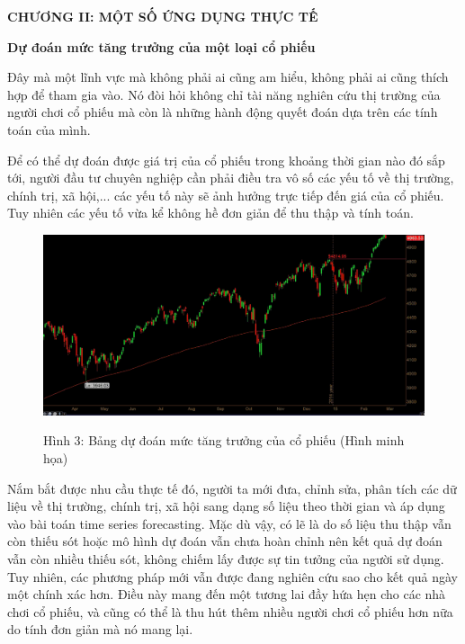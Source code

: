 \newpage
\changefontsizes{16pt}
\centerline{\textbf{CHƯƠNG II: MỘT SỐ ỨNG DỤNG THỰC TẾ}}

\vspace{1cm}
\changefontsizes{15pt}
\setlength{\parindent}{0cm}
\textbf{Dự đoán mức tăng trưởng của một loại cổ phiếu}

\vspace{0.5cm}
\changefontsizes{13pt}
\setlength{\parindent}{0cm}


Đây mà một lĩnh vực mà không phải ai cũng am hiểu, không phải ai cũng thích hợp để tham gia vào. Nó đòi hỏi không chỉ tài năng nghiên cứu thị trường của người chơi cổ phiếu mà còn là những hành động quyết đoán dựa trên các tính toán của mình.

\bigskip
Để có thể dự đoán được giá trị của cổ phiếu trong khoảng thời gian nào đó sắp tới, người đầu tư chuyên nghiệp cần phải điều tra vô số các yếu tố về thị trường, chính trị, xã hội,... các yếu tố này sẽ ảnh hưởng trực tiếp đến giá của cổ phiếu. Tuy nhiên các yếu tố vừa kể không hề đơn giản để thu thập và tính toán.




\begin{center}
	\begin{figure}[htp]
		\begin{center}
			\includegraphics[scale=.3]{./images/stock.png}
		\end{center}
		\label{fig1}{Hình 3: Bảng dự đoán mức tăng trưởng của cổ phiếu (Hình minh họa)}
	\end{figure}
\end{center}


Nắm bắt được nhu cầu thực tế đó, người ta mới đưa, chỉnh sửa, phân tích các dữ liệu về thị trường, chính trị, xã hội sang dạng số liệu theo thời gian và áp dụng vào bài toán time series forecasting. Mặc dù vậy, có lẽ là do số liệu thu thập vẫn còn thiếu sót hoặc mô hình dự đoán vẫn chưa hoàn chỉnh nên kết quả dự đoán vẫn còn nhiều thiếu sót, không chiếm lấy được sự tin tưởng của người sử dụng. Tuy nhiên, các phương pháp mới vẫn được đang nghiên cứu sao cho kết quả ngày một chính xác hơn. Điều này mang đến một tương lai đầy hứa hẹn cho các nhà chơi cổ phiếu, và cũng có thể là thu hút thêm nhiều người chơi cổ phiếu hơn nữa do tính đơn giản mà nó mang lại.


